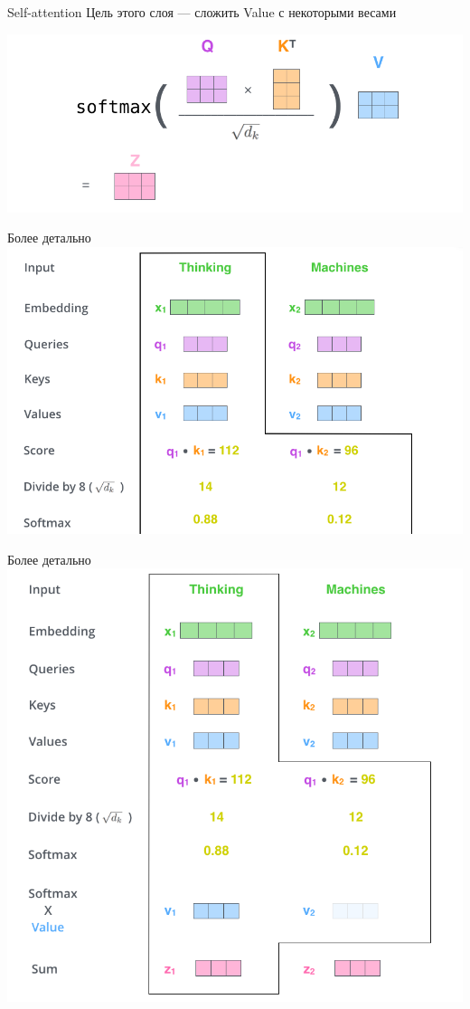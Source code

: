 \documentclass[notes,12pt, aspectratio=169]{beamer}
\begin{document}
\begin{frame}{Self-attention} 
	Цель этого слоя — сложить Value с некоторыми весами
	
	\begin{center}
		\includegraphics[width=.9\linewidth]{self_final.png}
	\end{center}
\end{frame}


\begin{frame}{Более детально}
	\centering
	\includegraphics[width=0.8\linewidth]{step_3}
\end{frame}


\begin{frame}{Более детально}
	\centering
	\includegraphics[width=0.5\linewidth]{step_4}
\end{frame}
\end{document}
